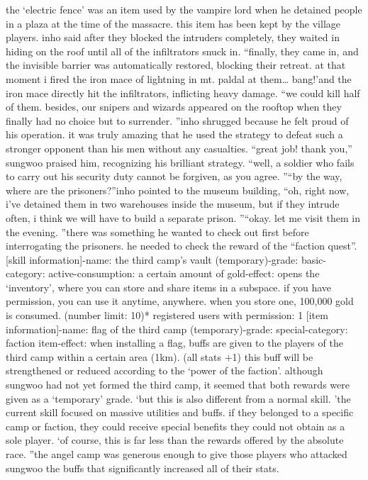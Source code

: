 the ‘electric fence’ was an item used by the vampire lord when he detained people in a plaza at the time of the massacre.
 this item has been kept by the village players.
inho said after they blocked the intruders completely, they waited in hiding on the roof until all of the infiltrators snuck in.
“finally, they came in, and the invisible barrier was automatically restored, blocking their retreat.
 at that moment i fired the iron mace of lightning in mt.
 paldal at them… bang!’and the iron mace directly hit the infiltrators, inflicting heavy damage.
“we could kill half of them.
 besides, our snipers and wizards appeared on the rooftop when they finally had no choice but to surrender.
”inho shrugged because he felt proud of his operation.
 it was truly amazing that he used the strategy to defeat such a stronger opponent than his men without any casualties.
“great job! thank you,” sungwoo praised him, recognizing his brilliant strategy.
“well, a soldier who fails to carry out his security duty cannot be forgiven, as you agree.
”“by the way, where are the prisoners?”inho pointed to the museum building, “oh, right now, i’ve detained them in two warehouses inside the museum, but if they intrude often, i think we will have to build a separate prison.
”“okay.
 let me visit them in the evening.
”there was something he wanted to check out first before interrogating the prisoners.
he needed to check the reward of the “faction quest”.
[skill information]-name: the third camp’s vault (temporary)-grade: basic-category: active-consumption: a certain amount of gold-effect: opens the ‘inventory’, where you can store and share items in a subspace.
 if you have permission, you can use it anytime, anywhere.
 when you store one, 100,000 gold is consumed.
 (number limit: 10)* registered users with permission: 1
[item information]-name: flag of the third camp (temporary)-grade: special-category: faction item-effect: when installing a flag, buffs are given to the players of the third camp within a certain area (1km).
 (all stats +1) this buff will be strengthened or reduced according to the ‘power of the faction’.
although sungwoo had not yet formed the third camp, it seemed that both rewards were given as a ‘temporary’ grade.
‘but this is also different from a normal skill.
’the current skill focused on massive utilities and buffs.
 if they belonged to a specific camp or faction, they could receive special benefits they could not obtain as a sole player.
‘of course, this is far less than the rewards offered by the absolute race.
”the angel camp was generous enough to give those players who attacked sungwoo the buffs that significantly increased all of their stats.
